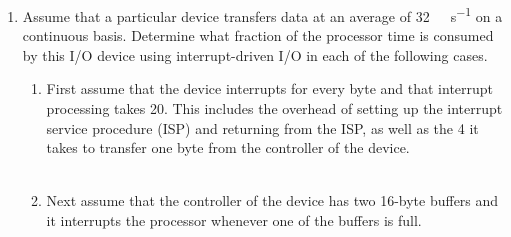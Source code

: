 \documentclass[12pt]{article}
\begin{document}

	\begin{enumerate}[itemsep=3em]
		\item{Assume that a particular device transfers data at an average of \SI{32}{\kilo\byte\per\s} on a continuous basis. Determine what fraction of the processor time is consumed by this I/O device using interrupt-driven I/O in each of the following cases.}\\	
		\begin{enumerate}[itemsep=3em]
			\item{First assume that the device interrupts for every byte and that interrupt processing takes \SI{20}{\mics}.  This includes the overhead of setting up the interrupt service procedure (ISP) and returning from the ISP, as well as the \SI{4}{\mics} it takes to transfer one byte from the controller of the device.}\\ \\
			
			\item{ Next assume that the controller of the device has two 16-byte buffers and it interrupts the processor whenever one of the buffers is full.}\\ \\
		

\end{enumerate}
\end{enumerate}
\end{document}
